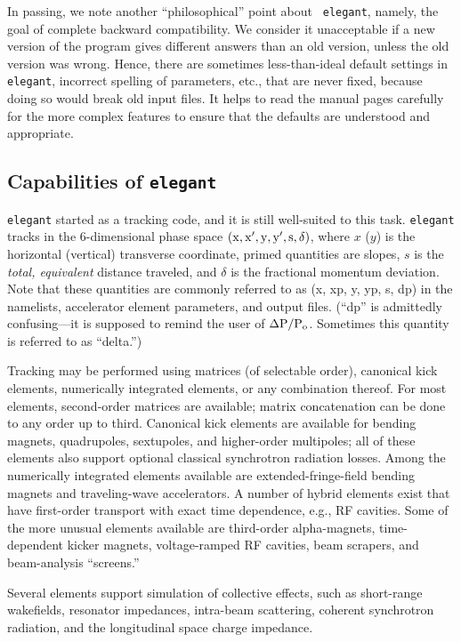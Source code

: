 \documentclass[11pt]{article}
\begin{document}
In passing, we note another ``philosophical'' point about {\tt
elegant}, namely, the goal of complete backward compatibility.  We
consider it unacceptable if a new version of the program gives
different answers than an old version, unless the old version was
wrong.  Hence, there are sometimes less-than-ideal default settings in
{\tt elegant}, incorrect spelling of parameters, etc., that are never
fixed, because doing so would break old input files.  It helps to read
the manual pages carefully for the more complex features to ensure that
the defaults are understood and appropriate.

\subsection{Capabilities of {\tt elegant}}

{\tt elegant} started as a tracking code, and it is still well-suited
to this task.  {\tt elegant} tracks in the 6-dimensional phase space
${\rm (x, x^\prime, y, y^\prime, s, \delta)}$, where $x$ ($y$) is the
horizontal (vertical) transverse coordinate, primed quantities are
slopes, $s$ is the {\em total, equivalent} distance traveled, and $\delta$ is the
fractional momentum deviation\cite{KLBrown}.  Note that these
quantities are commonly referred to as (x, xp, y, yp, s, dp) in the
namelists, accelerator element parameters, and output files.  (``dp''
is admittedly confusing---it is supposed to remind the user of ${\rm
\Delta P/P_o}$.  Sometimes this quantity is referred to as ``delta.'')

Tracking may be performed using matrices (of selectable order),
canonical kick elements, numerically integrated elements, or any
combination thereof.  For most elements, second-order matrices are
available; matrix concatenation can be done to any order up to third.
Canonical kick elements are available for bending magnets,
quadrupoles, sextupoles, and higher-order multipoles; all of these
elements also support optional classical synchrotron radiation losses.
Among the numerically integrated elements available are
extended-fringe-field bending magnets and traveling-wave accelerators.
A number of hybrid elements exist that have first-order transport with
exact time dependence, e.g., RF cavities.    Some of the more unusual
elements available are third-order
alpha-magnets\cite{Enge,Borland_thesis}, time-dependent kicker
magnets, voltage-ramped RF cavities, beam scrapers, and beam-analysis
``screens.''

Several elements support simulation of collective effects, such as
short-range wakefields, resonator impedances, intra-beam scattering,
coherent synchrotron radiation, and the longitudinal space charge
impedance. 
\end{document}
